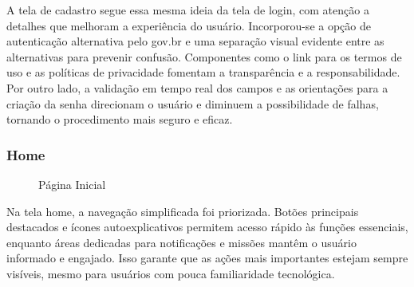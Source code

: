 \documentclass[a4paper, 12pt]{article}
\begin{document}
A tela de cadastro segue essa mesma ideia da tela de login, com atenção a detalhes que melhoram a experiência do usuário. Incorporou-se a opção de autenticação alternativa pelo gov.br e uma separação visual evidente entre as alternativas para prevenir confusão.  Componentes como o link para os termos de uso e as políticas de privacidade fomentam a transparência e a responsabilidade. Por outro lado, a validação em tempo real dos campos e as orientações para a criação da senha direcionam o usuário e diminuem a possibilidade de falhas, tornando o procedimento mais seguro e eficaz.

\subsubsection{Home}

\begin{figure}[H]
  \centering
  \caption{Página Inicial}
  \label{fig:home}
\end{figure}

Na tela home, a navegação simplificada foi priorizada. Botões principais destacados e ícones autoexplicativos permitem acesso rápido às funções essenciais, enquanto áreas dedicadas para notificações e missões mantêm o usuário informado e engajado. Isso garante que as ações mais importantes estejam sempre visíveis, mesmo para usuários com pouca familiaridade tecnológica.
\end{document}

